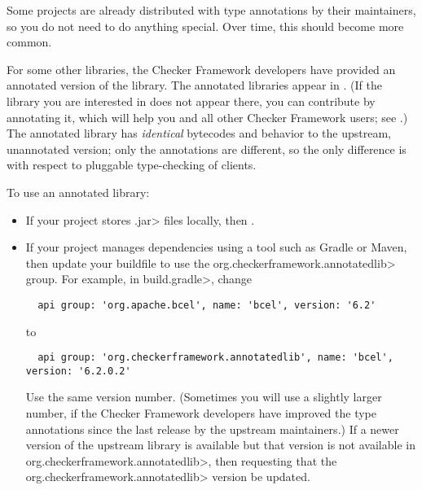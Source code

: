 Some projects are already distributed with type annotations by their
maintainers, so you do not need to do anything special.
Over time, this should become more common.

For some other libraries, the Checker Framework developers have provided an
annotated version of the library.
The annotated libraries appear in
.
(If the library you are interested in does not appear there, you can
contribute by annotating it, which will help you and all other Checker
Framework users; see .)
The annotated library has \emph{identical} bytecodes and behavior to the
upstream, unannotated version; only the annotations are different, so the
only difference is with respect to pluggable type-checking of clients.

To use an annotated library:

\begin{itemize}
\item
If your project stores \<.jar> files locally, then
.

\item
If your project manages dependencies using a tool such as Gradle or Maven,
then update your buildfile to use the \<org.checkerframework.annotatedlib>
group.  For example, in \<build.gradle>, change

\begin{Verbatim}
  api group: 'org.apache.bcel', name: 'bcel', version: '6.2'
\end{Verbatim}

\noindent
to

\begin{Verbatim}
  api group: 'org.checkerframework.annotatedlib', name: 'bcel', version: '6.2.0.2'
\end{Verbatim}

\noindent
Use the same version number.  (Sometimes you will use a slightly larger
number, if the Checker Framework developers have improved the type
annotations since the last release by the upstream maintainers.)  If a
newer version of the upstream library is available but that version is not
available in \<org.checkerframework.annotatedlib>, then
 requesting that the
\<org.checkerframework.annotatedlib> version be updated.
\end{itemize}

